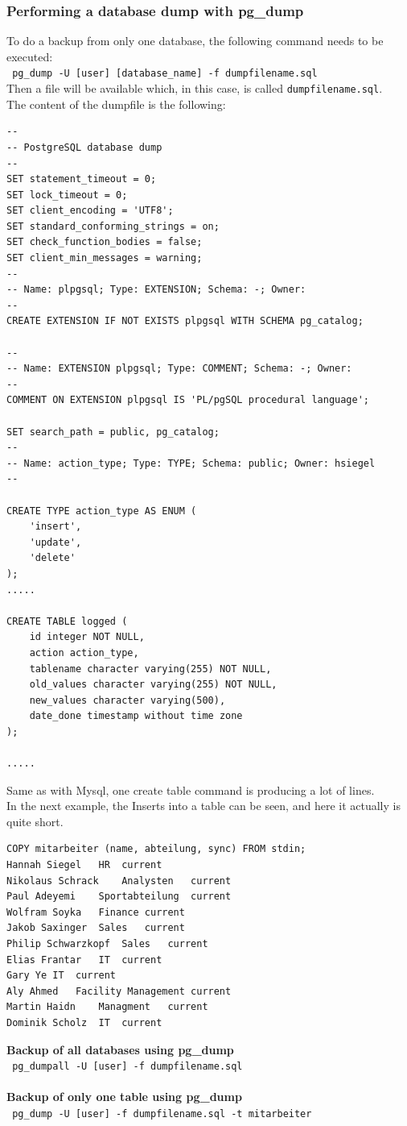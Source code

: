 \documentclass[10pt]{article}
\begin{document}
\subsubsection{Performing a database dump with pg\_dump \cite{pgdumpdoc}}
To do a backup from only one database, the following command needs to be executed: \\
\texttt{ pg\_dump -U [user] [database\_name] -f dumpfilename.sql } \\
Then a file will be available which, in this case, is called \texttt{dumpfilename.sql}.\\ 
The content of the dumpfile is the following:
\begin{lstlisting}    
--
-- PostgreSQL database dump
--
SET statement_timeout = 0;
SET lock_timeout = 0;
SET client_encoding = 'UTF8';
SET standard_conforming_strings = on;
SET check_function_bodies = false;
SET client_min_messages = warning;
--
-- Name: plpgsql; Type: EXTENSION; Schema: -; Owner: 
--
CREATE EXTENSION IF NOT EXISTS plpgsql WITH SCHEMA pg_catalog;

--
-- Name: EXTENSION plpgsql; Type: COMMENT; Schema: -; Owner: 
--
COMMENT ON EXTENSION plpgsql IS 'PL/pgSQL procedural language';

SET search_path = public, pg_catalog;
--
-- Name: action_type; Type: TYPE; Schema: public; Owner: hsiegel
--

CREATE TYPE action_type AS ENUM (
    'insert',
    'update',
    'delete'
);
.....

CREATE TABLE logged (
    id integer NOT NULL,
    action action_type,
    tablename character varying(255) NOT NULL,
    old_values character varying(255) NOT NULL,
    new_values character varying(500),
    date_done timestamp without time zone
);

.....
\end{lstlisting}    
Same as with Mysql, one create table command is producing a lot of lines. \\
In the next example, the Inserts into a table can be seen, and here it actually is quite short.
\begin{lstlisting}    
COPY mitarbeiter (name, abteilung, sync) FROM stdin;
Hannah Siegel	HR	current
Nikolaus Schrack	Analysten	current
Paul Adeyemi	Sportabteilung	current
Wolfram Soyka	Finance	current
Jakob Saxinger	Sales	current
Philip Schwarzkopf	Sales	current
Elias Frantar	IT	current
Gary Ye	IT	current
Aly Ahmed	Facility Management	current
Martin Haidn	Managment	current
Dominik Scholz	IT	current
\end{lstlisting}    
\textbf{Backup of all databases using pg\_dump}\\
\texttt{ pg\_dumpall -U [user] -f dumpfilename.sql} \\ \\
\textbf{Backup of only one table using pg\_dump}\\
\texttt{ pg\_dump -U [user] -f dumpfilename.sql -t mitarbeiter} 
\end{document}
